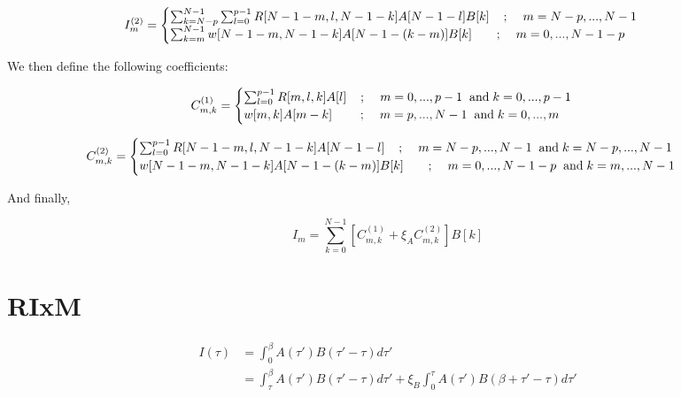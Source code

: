 \documentclass[]{article}
\newcommand{\AND}{\hspace{0.2cm} \mathrm{and} \hspace{0.1cm}}
\begin{document}
\[
I^{(2)}_m =\begin{cases}
           \sum_{k=N-p}^{N-1} \sum_{l=0}^{p-1} R[N-1-m,l,N-1-k] A[N-1-l] B[k] \hspace{0.4cm}; \hspace{0.4cm} m=N-p,...,N-1\\
           \sum_{k=m}^{N-1} w[N-1-m,N-1-k] A[N-1-(k-m)] B[k] \hspace{0.7cm}; \hspace{0.4cm} m=0,...,N-1-p
           \end{cases}
\]

We then define the following coefficients:

\[
C^{(1)}_{m,k} =\begin{cases}
            \sum_{l=0}^{p-1} R[m,l,k] A[l] \hspace{0.4cm}; \hspace{0.4cm} m=0,...,p-1 \AND k=0,...,p-1\\
            w[m,k] A[m-k] \hspace{0.8cm}; \hspace{0.4cm} m=p,...,N-1 \AND k=0,...,m
            \end{cases}
\]

\[
C^{(2)}_{m,k} =\begin{cases}
           \sum_{l=0}^{p-1} R[N-1-m,l,N-1-k] A[N-1-l] \hspace{0.4cm}; \hspace{0.4cm} m=N-p,...,N-1 \AND k=N-p,...,N-1\\
           w[N-1-m,N-1-k] A[N-1-(k-m)] B[k] \hspace{0.7cm}; \hspace{0.4cm} m=0,...,N-1-p \AND k=m,...,N-1
           \end{cases}
\]

And finally,

\[
I_m = \sum_{k=0}^{N-1} \left[ C^{(1)}_{m,k} + \xi_A C^{(2)}_{m,k} \right] B[k]
\]


\section{RIxM}

\[
\begin{split}
I(\tau) &= \int_0^\beta A(\tau')B(\tau'-\tau) d\tau' \\
        &=  \int_\tau^\beta A(\tau')B(\tau'-\tau) d\tau' + \xi_B \int_0^\tau A(\tau')B(\beta+\tau'-\tau) d\tau'
\end{split}
\]
\end{document}
